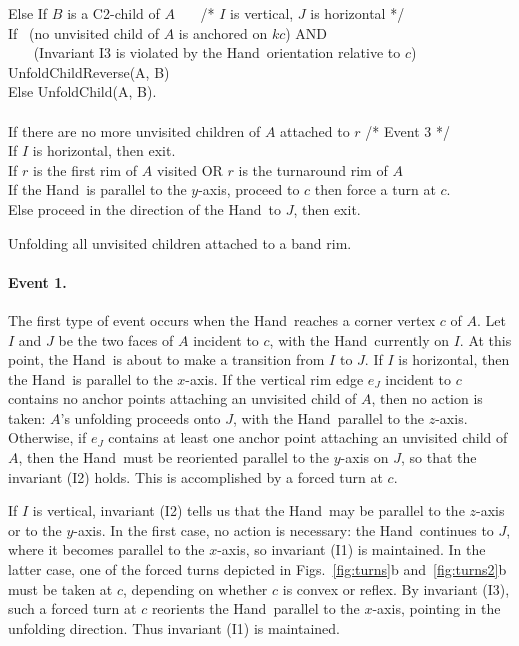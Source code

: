 \documentclass[11pt]{article}
\newcommand\hand{{\sc Hand}}
\newcommand\unfold{{\sc UnfoldChild}}
\newcommand\unfoldrev{{\sc UnfoldChildReverse}}
\begin{document}
\begin{table}[hptb]
\begin{center}
{\begin{minipage}[h]{0.85\linewidth}
{\begin{tabbing}
\>\> Else If $B$ is a C2-child of $A$ ~~~/* $I$ is vertical, $J$ is horizontal */ \\
\>\>\> If ~(no unvisited child of $A$ is anchored on $kc$) AND \\
\>\>\> ~~~ (Invariant I3 is violated by the \hand\ orientation relative to $c$) \\
\>\>\>\> \unfoldrev(A, B) \\
\>\>\> Else \unfold(A, B). \\
\\
\>If there are no more unvisited children of $A$ attached to $r$ /* Event 3 */\\
\>\> If $I$ is horizontal, then exit. \\
\>\> If $r$ is the first rim of $A$ visited OR $r$ is the turnaround rim of $A$  \\
\>\> \> If the \hand\ is parallel to the $y$-axis, proceed to $c$ then force a turn at $c$. \\
\>\> \> Else proceed in the direction of the \hand\ to $J$, then exit.
\end{tabbing}}
\end{minipage}
}\vspace{1mm}
\end{center}
\vspace{-1em}\caption{Unfolding all unvisited children attached to a band rim.}
\label{tab:rimunfold}
\end{table}

\paragraph{Event 1.} The first type of event occurs when the \hand\ reaches a corner vertex $c$ of $A$. Let $I$ and $J$ be the two faces of $A$ incident to $c$, with the \hand\ currently on $I$. At this point, the \hand\ is about to make a transition from $I$ to $J$. 
If $I$ is horizontal, then the \hand\ is parallel to the $x$-axis. If the vertical rim edge $e_J$ incident to $c$ contains no anchor points attaching an unvisited child of $A$, then no action is taken: $A$'s unfolding proceeds onto $J$, with the \hand\ parallel to the $z$-axis.
Otherwise, if $e_J$ contains at least one anchor point attaching an unvisited child of $A$, then the \hand\ must be reoriented parallel to the $y$-axis on $J$, so that the invariant (I2) holds. This is accomplished by a forced turn at $c$.


If $I$ is vertical, invariant (I2) tells us that the \hand\ may be parallel to the $z$-axis or to the $y$-axis. In the first case, no action is necessary: the \hand\ continues to $J$, where it becomes parallel to the $x$-axis, so invariant (I1) is maintained.
In the latter case, one of the forced turns depicted in Figs.~\ref{fig:turns}b and~\ref{fig:turns2}b must be taken at $c$, depending on whether $c$ is convex or reflex. By invariant (I3), such a forced turn at $c$ reorients the \hand\ parallel to the $x$-axis, pointing in the unfolding direction. Thus invariant (I1) is maintained.
\end{document}
